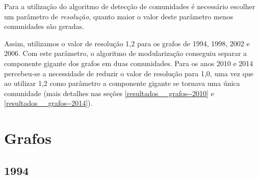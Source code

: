 Para a utilização do algoritmo de detecção de comunidades é necessário escolher um parâmetro de \emph{resolução}, quanto maior o valor deste parâmetro menos comunidades são geradas.

Assim, utilizamos o valor de resolução 1,2 para os grafos de 1994, 1998, 2002 e 2006. Com este parâmetro, o algoritmo de modularização conseguiu separar a componente gigante dos grafos em duas comunidades. Para os anos 2010 e 2014 percebeu-se a necessidade de reduzir o valor de resolução para 1,0, uma vez que ao utilizar 1,2 como parâmetro a componente gigante se tornava uma única comunidade (mais detalhes nas seções \ref{resultados__grafos--2010} e \ref{resultados__grafos--2014}).

\section{Grafos}
\label{resultados__grafos}


\subsection{1994}
\label{resultados__grafos--1994}

